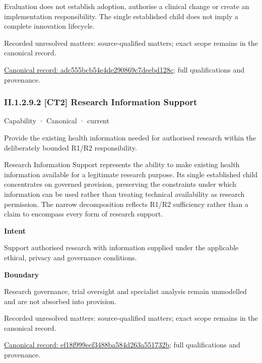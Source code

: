 Evaluation does not establish adoption, authorise a clinical change or create an implementation responsibility. The single established child does not imply a complete innovation lifecycle.


{\small Recorded unresolved matters: source-qualified matters; exact scope remains in the canonical record.}\par
{\footnotesize \href{../../../../../../../continuum/strategy/capability/adc555bcb54e4de290869c7deebd128c.md}{Canonical record: adc555bcb54e4de290869c7deebd128c}; full qualifications and provenance.}\par
\subsubsection*{II.1.2.9.2 [CT2] Research Information Support}
\label{navigation:II.1.2.9.2}

\label{element:ef18f999eef3488ba584d263a551732b}
{\small Capability · Canonical · current}\par

Provide the existing health information needed for authorised research within the deliberately bounded R1/R2 responsibility.



Research Information Support represents the ability to make existing health information available for a legitimate research purpose. Its single established child concentrates on governed provision, preserving the constraints under which information can be used rather than treating technical availability as research permission. The narrow decomposition reflects R1/R2 sufficiency rather than a claim to encompass every form of research support.



\textbf{Intent}



Support authorised research with information supplied under the applicable ethical, privacy and governance conditions.



\textbf{Boundary}



Research governance, trial oversight and specialist analysis remain unmodelled and are not absorbed into provision.


{\small Recorded unresolved matters: source-qualified matters; exact scope remains in the canonical record.}\par
{\footnotesize \href{../../../../../../../continuum/strategy/capability/ef18f999eef3488ba584d263a551732b.md}{Canonical record: ef18f999eef3488ba584d263a551732b}; full qualifications and provenance.}\par
